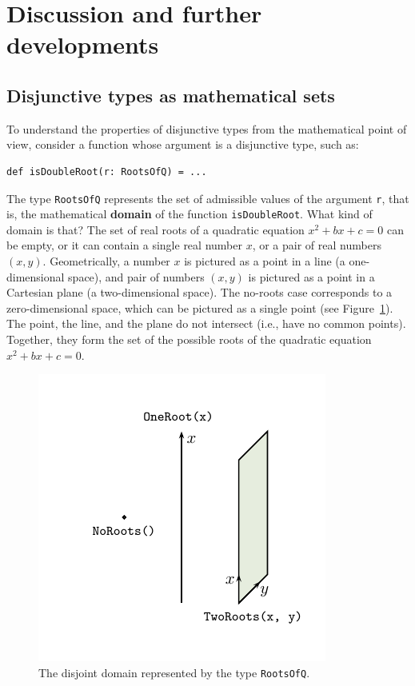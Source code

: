 \section{Discussion and further developments}

\subsection{Disjunctive types as mathematical sets}

To understand the properties of disjunctive types from the mathematical
point of view, consider a function whose argument is a disjunctive
type, such as:
\begin{lstlisting}
def isDoubleRoot(r: RootsOfQ) = ...
\end{lstlisting}
The type \lstinline!RootsOfQ! represents the set of admissible values
of the argument \lstinline!r!, that is, the mathematical \textbf{domain}
of the function \lstinline!isDoubleRoot!. What kind of domain is
that? The set of real roots of a quadratic equation $x^{2}+bx+c=0$
can be empty, or it can contain a single real number $x$, or a pair
of real numbers $\left(x,y\right)$. Geometrically, a number $x$
is pictured as a point in a line (a one-dimensional space), and pair
of numbers $\left(x,y\right)$ is pictured as a point in a Cartesian
plane (a two-dimensional space). The no-roots case corresponds to
a zero-dimensional space, which can be pictured as a single point
(see Figure~\ref{fig:RootsOfQ-disjoint-domain}). The point, the
line, and the plane do not intersect (i.e., have no common points).
Together, they form the set of the possible roots of the quadratic
equation $x^{2}+bx+c=0$.

\begin{figure}[h]
\begin{centering}
\hspace{-1cm}\includegraphics[scale=1.2]{chapter3-picture}
\par\end{centering}
\vspace{-1.4\baselineskip}
\caption{The disjoint domain represented by the type \lstinline!RootsOfQ!.\label{fig:RootsOfQ-disjoint-domain}}
\end{figure}

